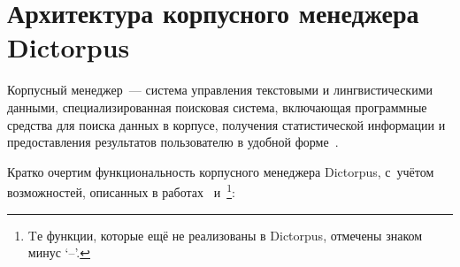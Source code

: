 
\section{Архитектура корпусного менеджера Dictorpus} \label{sect_arch_corpus_manager}

Корпусный менеджер~--- система управления текстовыми и лингвистическими данными, 
специализированная поисковая система, включающая программные средства для поиска данных в корпусе, получения статистической информации и предоставления результатов пользователю 
в удобной форме~\cite[с.~3]{Zakharov2005}.

Кратко очертим функциональность корпусного менеджера Dictorpus, 
с~учётом возможностей, описанных 
в работах~\cite[с.~414--415]{Kibrik2019}
и~\cite[с.~10--11]{Zakharov2005}\footnote{Tе функции, 
которые ещё не реализованы в Dictorpus, отмечены знаком минус `--'.}:
